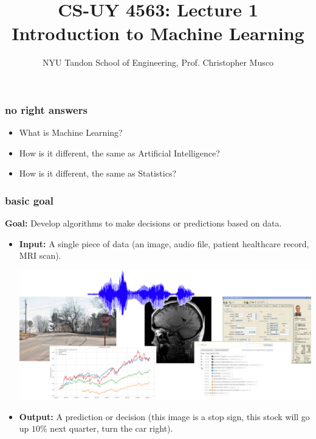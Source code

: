 \documentclass[handout,compress]{beamer}
\title{CS-UY 4563: Lecture 1 \\ Introduction to Machine Learning}
\author{NYU Tandon School of Engineering, Prof. Christopher Musco}
\date{}
\begin{document}
\begin{frame}
	\titlepage 
\end{frame}

\begin{frame}[t]
	\frametitle{no right answers}
	\begin{itemize}
		\item What is \alert{Machine Learning}?
		\item How is it different, the same as \alert{Artificial Intelligence}?
		\item How is it different, the same as \alert{Statistics}?
	\end{itemize}
\end{frame}

\begin{frame}
	\frametitle{basic goal}
	\textbf{Goal:} Develop algorithms to make decisions or predictions based on data.
	\begin{itemize}
		\item \textbf{Input:} A single piece of data (an image, audio file, patient healthcare record, MRI scan).
		\begin{center}
		\includegraphics[width=.6\textwidth]{data_examples.png}
		\end{center}
		\item \textbf{Output:} A prediction or decision (this image is a stop sign, this stock will go up $10\%$ next quarter, turn the car right).
	\end{itemize}
\end{frame}
\end{document}
